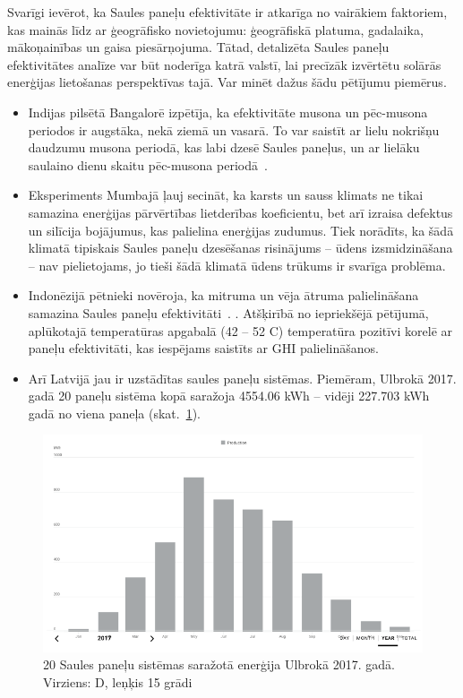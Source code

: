 Svarīgi ievērot, ka Saules paneļu efektivitāte ir atkarīga no vairākiem faktoriem, kas mainās līdz ar ģeogrāfisko novietojumu: ģeogrāfiskā platuma, gadalaika, mākoņainības un gaisa piesārņojuma. Tātad, detalizēta Saules paneļu efektivitātes analīze var būt noderīga katrā valstī, lai precīzāk izvērtētu solārās enerģijas lietošanas perspektīvas tajā. Var minēt dažus šādu pētījumu piemērus.
\begin{itemize}
  \item Indijas pilsētā Bangalorē izpētīja, ka efektivitāte musona un pēc-musona periodos ir augstāka, nekā ziemā un vasarā. To var saistīt ar lielu nokrišņu daudzumu musona periodā, kas labi dzesē Saules paneļus, un ar lielāku saulaino dienu skaitu pēc-musona periodā~\cite{effectCloudsOnSurface}.
  \item Eksperiments Mumbajā \cite{improvePerformance} ļauj secināt, ka karsts un sauss klimats ne tikai samazina enerģijas pārvērtības lietderības koeficientu, bet arī izraisa defektus un silīcija bojājumus, kas palielina enerģijas zudumus. Tiek norādīts, ka šādā klimatā tipiskais Saules paneļu dzesēšanas risinājums -- ūdens izsmidzināšana -- nav pielietojams, jo tieši šādā klimatā ūdens trūkums ir svarīga problēma.
  \item Indonēzijā pētnieki novēroja, ka mitruma un vēja ātruma palielināšana samazina Saules paneļu efektivitāti~\cite{improvePerformance}.
  \cite{Sani_2018}. Atšķirībā no iepriekšējā pētījumā, aplūkotajā temperatūras apgabalā (42 -- 52 \textdegree C) temperatūra pozitīvi korelē ar paneļu efektivitāti, kas iespējams saistīts ar GHI palielināšanos. 
  \item Arī Latvijā jau ir uzstādītas saules paneļu sistēmas. Piemēram, Ulbrokā 2017. gadā 20 paneļu sistēma kopā saražoja 4554.06 kWh -- vidēji 227.703 kWh gadā no viena paneļa (skat.~\ref{fig:ulbroka}).
\end{itemize}


\begin{figure}[h]
  \centering
  \includegraphics[width=\linewidth]{figures/misc/2017.png}
  \caption{20 Saules paneļu sistēmas saražotā enerģija Ulbrokā 2017. gadā. Virziens: D, leņķis 15 grādi \cite{fronius}}
  \label{fig:ulbroka}
\end{figure}

